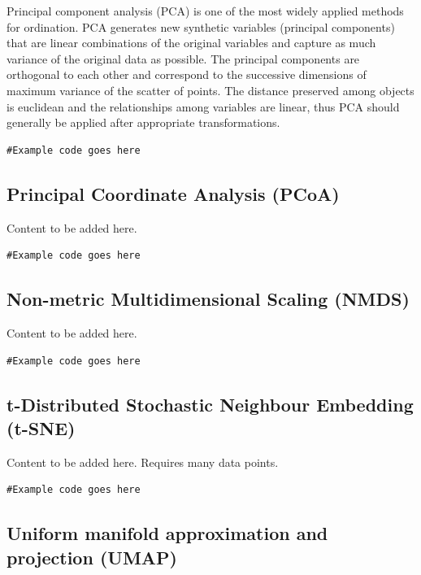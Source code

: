 \documentclass[
]{book}
\begin{document}
Principal component analysis (PCA) is one of the most widely applied methods for ordination. PCA generates new synthetic variables (principal components) that are linear combinations of the original variables and capture as much variance of the original data as possible. The principal components are orthogonal to each other and correspond to the successive dimensions of maximum variance of the scatter of points. The distance preserved among objects is euclidean and the relationships among variables are linear, thus PCA should generally be applied after appropriate transformations.

\begin{verbatim}
#Example code goes here
\end{verbatim}

\hypertarget{pcoa}{%
\subsection{Principal Coordinate Analysis (PCoA)}\label{pcoa}}

Content to be added here.

\begin{verbatim}
#Example code goes here
\end{verbatim}

\hypertarget{nmds}{%
\subsection{Non-metric Multidimensional Scaling (NMDS)}\label{nmds}}

Content to be added here.

\begin{verbatim}
#Example code goes here
\end{verbatim}

\hypertarget{t-sne}{%
\subsection{t-Distributed Stochastic Neighbour Embedding (t-SNE)}\label{t-sne}}

Content to be added here.
Requires many data points.

\begin{verbatim}
#Example code goes here
\end{verbatim}

\hypertarget{umap}{%
\subsection{Uniform manifold approximation and projection (UMAP)}\label{umap}}
\end{document}
